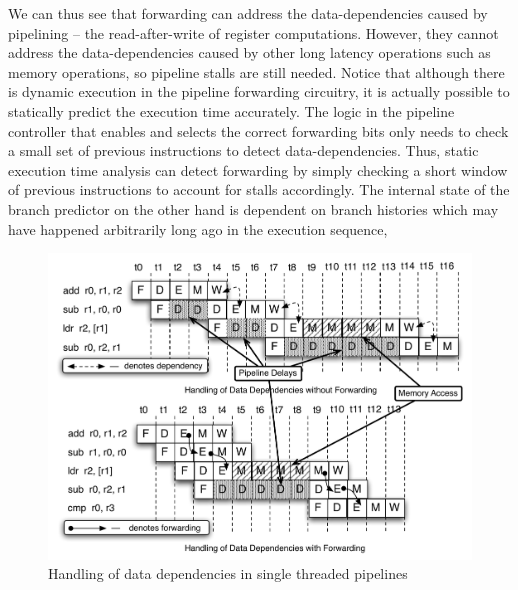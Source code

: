 We can thus see that forwarding can address the data-dependencies caused by pipelining -- the read-after-write of register computations. 
However, they cannot address the data-dependencies caused by other long latency operations such as memory operations, so pipeline stalls are still needed. 
Notice that although there is dynamic execution in the pipeline forwarding circuitry, it is actually possible to statically predict the execution time accurately.
The logic in the pipeline controller that enables and selects the correct forwarding bits only needs to check a small set of previous instructions to detect data-dependencies. 
Thus, static execution time analysis can detect forwarding by simply checking a short window of previous instructions to account for stalls accordingly. 
The internal state of the branch predictor on the other hand is dependent on branch histories which may have happened arbitrarily long ago in the execution sequence,
 
\begin{figure}
\begin{center}
\includegraphics[scale=.6]{figs/data_depend_execution_non_interleaved}
\end{center}
\vspace{-10pt}
\caption{Handling of data dependencies in single threaded pipelines}
\label{fig:data_depend_execution_non_interleaved}
\end{figure} 
 

